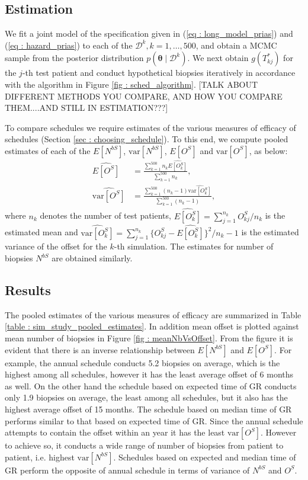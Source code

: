 \subsection{Estimation}
We fit a joint model of the specification given in (\ref{eq : long_model_prias}) and (\ref{eq : hazard_prias}) to each of the $\mathcal{D}^k, k=1,
\ldots, 500$, and obtain a MCMC sample from the posterior distribution $p(\boldsymbol{\theta} \mid \mathcal{D}^k)$. We next obtain $g(T^*_{kj})$ for the $j$-th test patient and conduct hypothetical biopsies iteratively in accordance with the algorithm in Figure \ref{fig : sched_algorithm}. 	[TALK ABOUT DIFFERENT METHODS YOU COMPARE, AND HOW YOU COMPARE THEM....AND STILL IN ESTIMATION???] 

To compare schedules we require estimates of the various measures of efficacy of schedules (Section \ref{sec : choosing_schedule}). To this end, we compute pooled estimates of each of the $E[N^{bS}]$, $\mbox{var}[N^{bS}]$, $E[O^S]$ and $\mbox{var}[O^S]$, as below:
\begin{align*}
\widehat{E[O^S]} &= \frac{\sum_{k=1}^{500} n_k \widehat{E[O^S_k]}}{\sum_{k=1}^{500} n_k}, \\
\widehat{\mbox{var}[O^S]} &= \frac{\sum_{k=1}^{500} (n_k - 1) \widehat{\mbox{var}[O^S_k]}}{\sum_{k=1}^{500} (n_k-1)}, 
\end{align*}
where $n_k$ denotes the number of test patients, $\widehat{E[O^S_k]} = {\sum_{j=1}^{n_k}O^S_{kj}}/{n_k}$ is the estimated mean and $\widehat{\mbox{var}[O^S_k]} = {\sum_{j=1}^{n_k}\big\{O^S_{kj} - \widehat{E[O^S_k]}\big\}^2}/{n_k-1}$ is the estimated variance of the offset for the $k$-th simulation. The estimates for number of biopsies $N^{bS}$ are obtained similarly.

\subsection{Results}
The pooled estimates of the various measures of efficacy are summarized in Table \ref{table : sim_study_pooled_estimates}. In addition mean offset is plotted against mean number of biopsies in Figure \ref{fig : meanNbVsOffset}. From the figure it is evident that there is an inverse relationship between $E[N^{bS}]$ and $E[O^S]$. For example, the annual schedule conducts 5.2 biopsies on average, which is the highest among all schedules, however it has the least average offset of 6 months as well. On the other hand the schedule based on expected time of GR conducts only 1.9 biopsies on average, the least among all schedules, but it also has the highest average offset of 15 months. The schedule based on median time of GR performs similar to that based on expected time of GR. Since the annual schedule attempts to contain the offset within an year it has the least $\mbox{var}[O^S]$. However to achieve so, it conducts a wide range of number of biopsies from patient to patient, i.e. highest $\mbox{var}[N^{bS}]$. Schedules based on expected and median time of GR perform the opposite of annual schedule in terms of variance of $N^{bS}$ and $O^S$.

